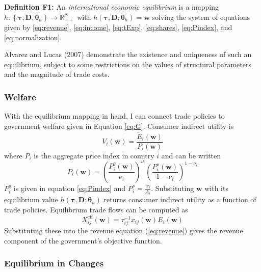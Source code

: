 \documentclass{puthesis}
\begin{document}
\textbf{Definition F1:} An \emph{international economic equilibrium} is
a mapping
\(h : \left\{ \bm{\tau}, \bm{D}, \bm{\theta}_h \right\} \rightarrow \mathbb{R}_{++}^N\)
with \(h(\bm{\tau}, \bm{D}; \bm{\theta}_h) = \bm{w}\) solving the system
of equations given by \ref{eq:revenue}, \ref{eq:income}, \ref{eq:tExp},
\ref{eq:shares}, \ref{eq:Pindex}, and \ref{eq:normalization}.

Alvarez and Lucas (2007) demonstrate the existence and uniqueness of
such an equilibrium, subject to some restrictions on the values of
structural parameters and the magnitude of trade costs.

\subsubsection{Welfare}

With the equilibrium mapping in hand, I can connect trade policies to
government welfare given in Equation \ref{eq:G}. Consumer indirect
utility is \begin{equation} \label{eq:V}
V_i(\bm{w}) = \frac{\tilde{E}_i(\bm{w})}{P_i(\bm{w})}
\end{equation} where \(P_i\) is the aggregate price index in country
\(i\) and can be written \[
P_i(\bm{w}) = \left( \frac{P_i^q(\bm{w})}{\nu_i} \right)^{\nu_i} \left( \frac{P_i^s(\bm{w})}{1 - \nu_i} \right)^{1 - \nu_i}
\] \(P_i^q\) is given in equation \ref{eq:Pindex} and
\(P_i^s = \frac{w_i}{A_i}\). Substituting \(\bm{w}\) with its
equilibrium value \(h(\bm{\tau}, \bm{D}; \bm{\theta}_h)\) returns
consumer indirect utility as a function of trade policies. Equilibrium
trade flows can be computed as \[
X_{ij}^{\text{cif}}(\bm{w}) = \tau_{ij}^{-1} x_{ij}(\bm{w}) E_i(\bm{w})
\] Substituting these into the revenue equation (\ref{eq:revenue}) gives
the revenue component of the government's objective function.

\subsubsection{Equilibrium in Changes}
\end{document}
